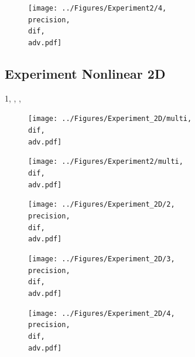 \documentclass{scrartcl}
\begin{document}
	\begin{figure}[H]
		\centering
		\texttt{[image: ../Figures/Experiment2/4, \\precision, \\dif, \\adv.pdf]}
	\end{figure}
	
	\subsection{Experiment Nonlinear 2D}
	{1, \precision, \dif, \adv}
	\begin{figure}[H]
		\centering
		\texttt{[image: ../Figures/Experiment\_2D/multi, \\dif, \\adv.pdf]}
	\end{figure}
	\begin{figure}[H]
		\centering
		\texttt{[image: ../Figures/Experiment2/multi, \\dif, \\adv.pdf]}
	\end{figure}
	
	\begin{figure}[H]
		\centering
		\texttt{[image: ../Figures/Experiment\_2D/2, \\precision, \\dif, \\adv.pdf]}
	\end{figure}
	
	\begin{figure}[H]
		\centering
		\texttt{[image: ../Figures/Experiment\_2D/3, \\precision, \\dif, \\adv.pdf]}
	\end{figure}
	
	\begin{figure}[H]
		\centering
		\texttt{[image: ../Figures/Experiment\_2D/4, \\precision, \\dif, \\adv.pdf]}
	\end{figure}
	
\end{document}

